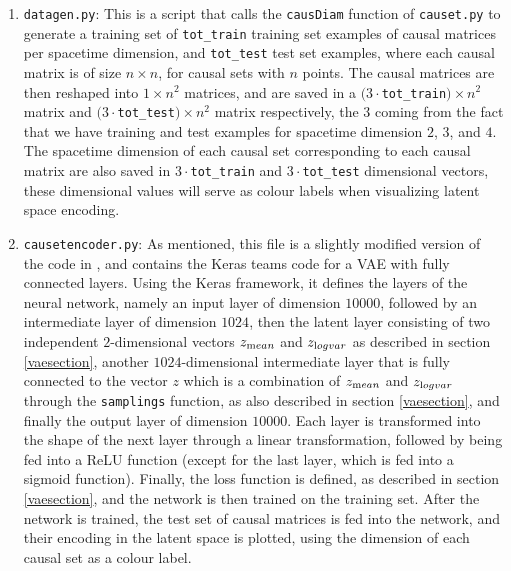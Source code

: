 \documentclass[letterpaper,10pt]{article}
\def\code#1{\texttt{#1}}
\begin{document}
\begin{enumerate}
\begin{itemize}
 \end{itemize}
 
 \item \code{datagen.py}: This is a script that calls the \code{causDiam} function of \code{causet.py} to generate a training set of \code{tot\_train} 
 training set examples of causal matrices per spacetime dimension, and \code{tot\_test} test set examples, where each causal matrix is of size $n\times n$, 
 for causal sets with $n$ points.  The causal matrices are then reshaped into $1\times n^2$ matrices, and are saved in a 
 $(3\cdot$\code{tot\_train}$)\times n^2$ matrix and $(3\cdot$\code{tot\_test}$)\times n^2$ matrix respectively, the $3$ coming from the fact that we 
 have training and test examples for spacetime dimension $2$, $3$, and $4$.  The spacetime dimension of each causal set corresponding to each causal matrix 
 are also saved in $3\cdot$\code{tot\_train} and $3\cdot$\code{tot\_test} dimensional vectors, these dimensional values will serve as colour labels 
 when visualizing latent space encoding.
 
 \item \code{causetencoder.py}: As mentioned, this file is a slightly modified version of the code in \cite{kerasauto}, and contains the Keras teams 
 code for a VAE with fully connected layers.  Using the Keras framework, it defines the layers of the neural network, namely an input layer of dimension 
 $10000$, followed by an intermediate layer of dimension $1024$, then the latent layer consisting of two independent $2$-dimensional vectors 
 $z_{\text mean}$ and $z_{\text log var}$ as described in section 
 \ref{vaesection}, another $1024$-dimensional intermediate layer that is fully connected to the vector $z$ which is a combination of 
 $z_{\text mean}$ and $z_{\text log var}$ through the \code{samplings} function, as also described in section \ref{vaesection}, and finally the output layer of dimension $10000$.  Each layer is 
 transformed into the shape of the next layer through a linear  transformation, followed by being fed into a ReLU function (except for the last layer, 
 which is fed into a sigmoid function). Finally, the loss function is defined, as described in section \ref{vaesection}, and the network is then 
 trained on the training set.  After the network is trained, the test set of causal matrices is fed into the network, and their encoding in the 
 latent space is plotted, using the dimension of each causal set as a colour label.
 

 
\end{enumerate}
\end{document}
